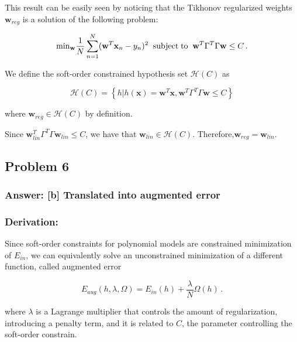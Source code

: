 \documentclass[11pt]{article}
\begin{document}
This result can be easily seen by noticing that the Tikhonov regularized
weights \(\mathbf{w}_{reg}\) is a solution of the following problem:

\begin{equation}
{\rm min}_\mathbf{w} \frac{1}{N}\sum_{n=1}^N(\mathbf{w}^T\mathbf{x}_n-y_n)^2 \;\; {\rm subject \; to} \;\; \mathbf{w}^T\Gamma^T\Gamma\mathbf{w}\le C\,.
\end{equation}

We define the soft-order constrained hypothesis set \(\mathcal{H}(C)\)
as

\begin{equation}
\mathcal{H}(C)=\left\{h|h(\mathbf{x})=\mathbf{w}^T\mathbf{x}, \mathbf{w}^T\Gamma^T\Gamma\mathbf{w}\le C\right\}
\end{equation}

where \(\mathbf{w}_{reg}\in \mathcal{H}(C)\) by definition.

Since \(\mathbf{w}_{lin}^T\Gamma^T\Gamma\mathbf{w}_{lin}\le C\), we have
that \(\mathbf{w}_{lin}\in\mathcal{H}(C)\).
Therefore,\(\mathbf{w}_{reg}=\mathbf{w}_{lin}\).

    \hypertarget{problem-6}{%
\subsection{Problem 6}\label{problem-6}}

\hypertarget{answer-b-translated-into-augmented-error}{%
\subsubsection{Answer: {[}b{]} Translated into augmented
error}\label{answer-b-translated-into-augmented-error}}

\hypertarget{derivation}{%
\subsubsection{Derivation:}\label{derivation}}

Since soft-order constraints for polynomial models are constrained
minimization of \(E_{in}\), we can equivalently solve an unconstrained
minimization of a different function, called augmented error

\begin{equation}
E_{aug}(h,\lambda,\Omega) = E_{in}(h)+\frac{\lambda}{N}\Omega(h)\,.
\end{equation}

where \(\lambda\) is a Lagrange multiplier that controls the amount of
regularization, introducing a penalty term, and it is related to \(C\),
the parameter controlling the soft-order constrain.
\end{document}

